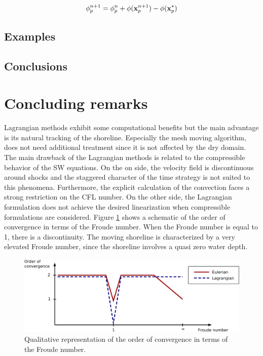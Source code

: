 \begin{equation}
    \phi_p^{n+1} = \phi_p^n + \phi({\bf x}_p^{n+1}) - \phi({\bf x}_p^*)
\end{equation}



\subsection{Examples}


\subsection{Conclusions}








\section{Concluding remarks}


Lagrangian methods exhibit some computational benefits but the main advantage is its natural tracking of the shoreline. Especially the mesh moving algorithm, does not need additional treatment since it is not affected by the dry domain. The main drawback of the Lagrangian methods is related to the compressible behavior of the SW equations. On the on side, the velocity field is discontinuous around shocks and the staggered character of the time strategy is not suited to this phenomena. Furthermore, the explicit calculation of the convection faces a strong restriction on the CFL number.
On the other side, the Lagrangian formulation does not achieve the desired linearization when compressible formulations are considered.
Figure \ref{pfem_euler_convergence} shows a schematic of the order of convergence in terms of the Froude number. When the Froude number is equal to 1, there is a discontinuity. The moving shoreline is characterized by a very elevated Froude number, since the shoreline involves a quasi zero water depth.

\begin{figure}
    \centering
    \includegraphics[width=\textwidth]{img/lagrangian/pfem_euler_convergence.png}
    \caption{Qualitative representation of the order of convergence in terms of the Froude number.}
    \label{pfem_euler_convergence}
\end{figure}


